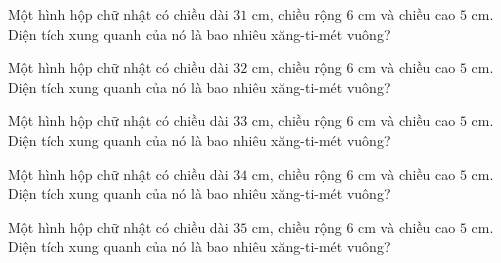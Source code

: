 \begin{ex}
  Một hình hộp chữ nhật có chiều dài $31\text{ cm}$, chiều rộng $6\text{ cm}$ và chiều cao $5\text{ cm}$. Diện tích xung quanh của nó là bao nhiêu xăng-ti-mét vuông?
\end{ex}

\begin{ex}
  Một hình hộp chữ nhật có chiều dài $32\text{ cm}$, chiều rộng $6\text{ cm}$ và chiều cao $5\text{ cm}$. Diện tích xung quanh của nó là bao nhiêu xăng-ti-mét vuông?
\end{ex}

\begin{ex}
  Một hình hộp chữ nhật có chiều dài $33\text{ cm}$, chiều rộng $6\text{ cm}$ và chiều cao $5\text{ cm}$. Diện tích xung quanh của nó là bao nhiêu xăng-ti-mét vuông?
\end{ex}

\begin{ex}
  Một hình hộp chữ nhật có chiều dài $34\text{ cm}$, chiều rộng $6\text{ cm}$ và chiều cao $5\text{ cm}$. Diện tích xung quanh của nó là bao nhiêu xăng-ti-mét vuông?
\end{ex}

\begin{ex}
  Một hình hộp chữ nhật có chiều dài $35\text{ cm}$, chiều rộng $6\text{ cm}$ và chiều cao $5\text{ cm}$. Diện tích xung quanh của nó là bao nhiêu xăng-ti-mét vuông?
\end{ex}
